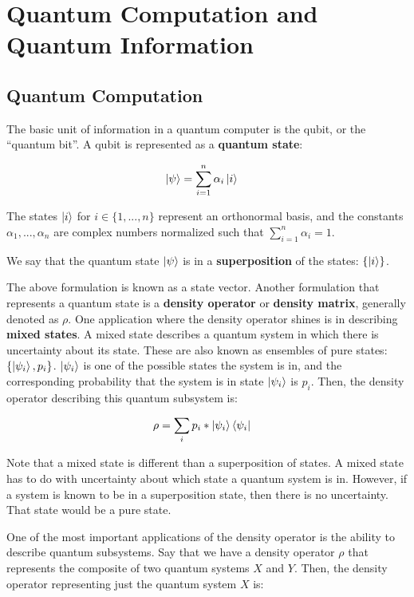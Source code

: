 \chapter{Quantum Computation and Quantum Information}
\label{ch:qc-prelim}

\section{Quantum Computation}
\label{sec:qc}

The basic unit of information in a quantum computer is the qubit, or the ``quantum bit''. A qubit is represented as a \textbf{quantum state}:

\begin{align}
    \ket{\psi} &= \sum_{i=1}^n \alpha_i\ket{i}
\end{align}

The states $\ket{i}$ for $i \in \{1,...,n\}$ represent an orthonormal basis, and the constants $\alpha_1,...,\alpha_n$ are complex numbers normalized such that $\sum_{i=1}^n \alpha_i = 1$.

We say that the quantum state $\ket{\psi}$ is in a \textbf{superposition} of the states: $\{\ket{i}\}$.


The above formulation is known as a state vector. Another formulation that represents a quantum state is a \textbf{density operator} or \textbf{density matrix}, generally denoted as $\rho$. One application where the density operator shines is in describing \textbf{mixed states}. A mixed state describes a quantum system in which there is uncertainty about its state. These are also known as ensembles of pure states: $\{\ket{\psi_i}, p_i\}$. $\ket{\psi_i}$ is one of the possible states the system is in, and the corresponding probability that the system is in state $\ket{\psi_i}$ is $p_i$. Then, the density operator describing this quantum subsystem is:

\begin{align}
    \rho &= \sum_{i} p_i * \ket{\psi_i}\bra{\psi_i}
\end{align}

Note that a mixed state is different than a superposition of states. A mixed state has to do with uncertainty about which state a quantum system is in. However, if a system is known to be in a superposition state, then there is no uncertainty. That state would be a pure state.

One of the most important applications of the density operator is the ability to describe quantum subsystems. Say that we have a density operator $\rho$ that represents the composite of two quantum systems $X$ and $Y$. Then, the density operator representing just the quantum system $X$ is:

